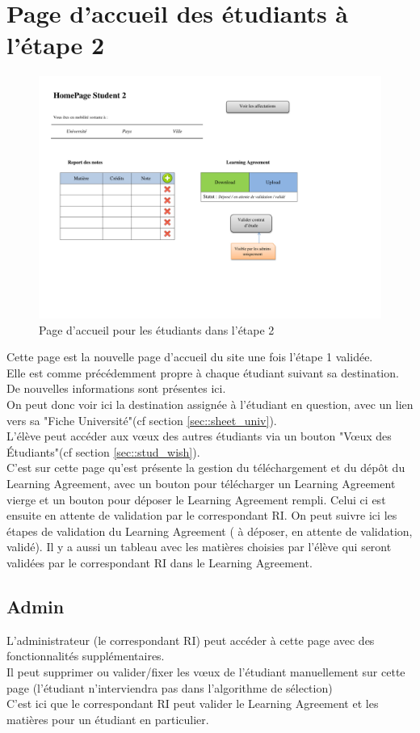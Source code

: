 \section{Page d'accueil des étudiants à l'étape 2}


\begin{figure}[H]
	\includegraphics[scale=0.6]{Etudiant/HomePageSt2.pdf}
	\caption{Page d'accueil pour les étudiants dans l'étape 2}
\end{figure}

Cette page est la nouvelle page d'accueil du site une fois l'étape 1 validée.\\
Elle est comme précédemment propre à chaque étudiant suivant sa destination. De nouvelles informations sont présentes ici.\\
On peut donc voir ici la destination assignée à l'étudiant en question, avec un lien vers sa "Fiche Université"(cf section \ref{sec::sheet_univ}).\\
L'élève peut accéder aux vœux des autres étudiants via un bouton "Vœux des Étudiants"(cf section \ref{sec::stud_wish}).\\
C'est sur cette page qu'est présente la gestion du téléchargement et du dépôt du Learning Agreement, avec un bouton pour télécharger un Learning Agreement vierge et un bouton pour déposer le Learning Agreement rempli.
Celui ci est ensuite en attente de validation par le correspondant RI. On peut suivre ici les étapes de validation du Learning Agreement ( à déposer, en attente de validation, validé).
\bigbreak
Il y a aussi un tableau avec les matières choisies par l'élève qui seront validées par le correspondant RI dans le Learning Agreement.\\

\subsection{Admin}

L'administrateur (le correspondant RI) peut accéder à cette page avec des fonctionnalités supplémentaires.\\
Il peut supprimer ou valider/fixer les vœux de l'étudiant manuellement sur cette page (l'étudiant n'interviendra pas dans l'algorithme de sélection)\\
C'est ici que le correspondant RI peut valider le Learning Agreement et les matières pour un étudiant en particulier.\\